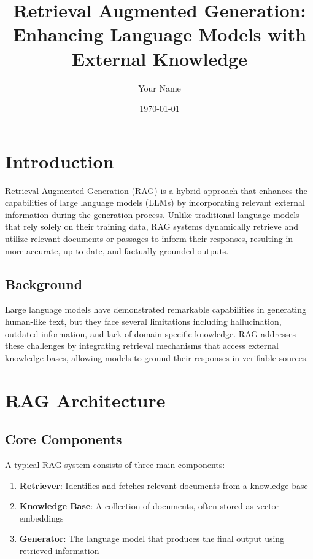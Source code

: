 \documentclass[]{article}
\title{Retrieval Augmented Generation: Enhancing Language Models with External Knowledge}
\author{Your Name}
\date{\today}
\begin{document}
\maketitle


\section{Introduction}
Retrieval Augmented Generation (RAG) is a hybrid approach that enhances the capabilities of large language models (LLMs) by incorporating relevant external information during the generation process. Unlike traditional language models that rely solely on their training data, RAG systems dynamically retrieve and utilize relevant documents or passages to inform their responses, resulting in more accurate, up-to-date, and factually grounded outputs.

\subsection{Background}
Large language models have demonstrated remarkable capabilities in generating human-like text, but they face several limitations including hallucination, outdated information, and lack of domain-specific knowledge. RAG addresses these challenges by integrating retrieval mechanisms that access external knowledge bases, allowing models to ground their responses in verifiable sources.

\section{RAG Architecture}

\subsection{Core Components}
A typical RAG system consists of three main components:

\begin{enumerate}
    \item \textbf{Retriever}: Identifies and fetches relevant documents from a knowledge base
    \item \textbf{Knowledge Base}: A collection of documents, often stored as vector embeddings
    \item \textbf{Generator}: The language model that produces the final output using retrieved information
\end{enumerate}
\end{document}
